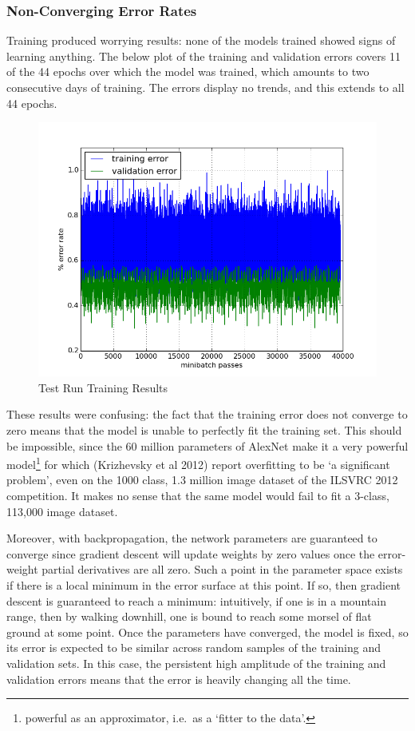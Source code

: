 \documentclass[a4paper,11pt]{article}
\begin{document}
\subsubsection{Non-Converging Error Rates}

Training produced worrying results: none of the models trained showed signs of learning anything. The below plot of the training and validation errors covers 11 of the 44 epochs over which the model was trained, which amounts to two consecutive days of training. The errors display no trends, and this extends to all 44 epochs.

\begin{figure}[!h]
	\centering
	\includegraphics[scale=0.5]{images/test_run.png}
	\caption{Test Run Training Results}
\end{figure}

These results were confusing: the fact that the training error does not converge to zero means that the model is unable to perfectly fit the training set. This should be impossible, since the 60 million parameters of AlexNet make it a very powerful model\footnote{powerful as an approximator, i.e.\ as a `fitter to the data'.} for which (Krizhevsky et al 2012) report overfitting to be `a significant problem', even on the 1000 class, 1.3 million image dataset of the ILSVRC 2012 competition. It makes no sense that the same model would fail to fit a 3-class, 113,000 image dataset.

Moreover, with backpropagation, the network parameters are guaranteed to converge \cite{DL-book} since gradient descent will update weights by zero values once the error-weight partial derivatives are all zero. Such a point in the parameter space exists if there is a local minimum in the error surface at this point. If so, then gradient descent is guaranteed to reach a minimum: intuitively, if one is in a mountain range, then by walking downhill, one is bound to reach some morsel of flat ground at some point. Once the parameters have converged, the model is fixed, so its error is expected to be similar across random samples of the training and validation sets. In this case, the persistent high amplitude of the training and validation errors means that the error is heavily changing all the time.
\end{document}
